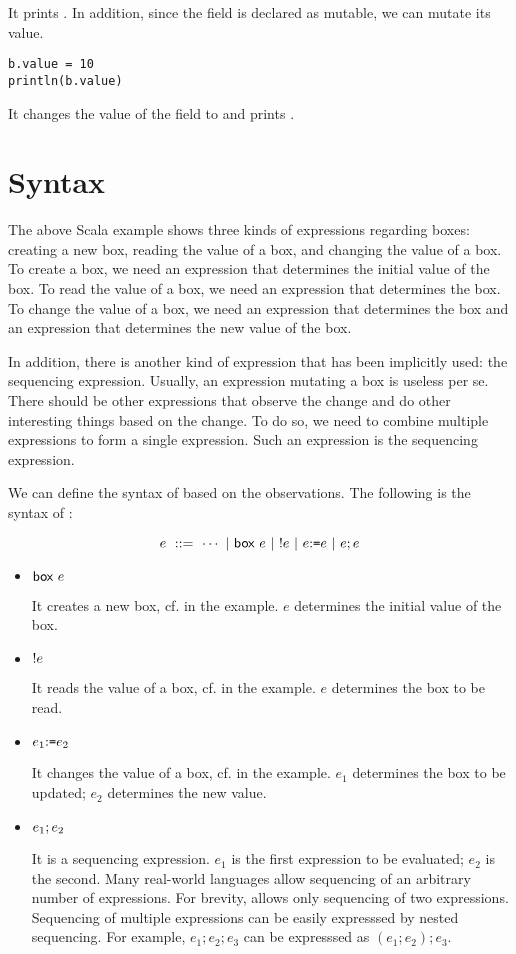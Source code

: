 It prints .
In addition, since the field  is declared as mutable, we can mutate
its value.

\begin{verbatim}
b.value = 10
println(b.value)
\end{verbatim}

It changes the value of the field to  and prints .

\section{Syntax}

The above Scala example shows three kinds of expressions regarding boxes:
creating a new box, reading the value of a box, and changing the value of a box.
To create a box, we need an expression that determines the initial value of the
box. To read the value of a box, we need an expression that determines the box.
To change the value of a box, we need an expression that determines the box and
an expression that determines the new value of the box.

In addition, there is another kind of expression that has been implicitly
used: the sequencing expression. Usually, an expression mutating a box is useless
per se. There should be other expressions that observe the change and do
other interesting things based on the change. To do so, we need to combine
multiple expressions to form a single expression. Such an expression
is the sequencing expression.

We can define the syntax of \lang based on the observations.
The following is the syntax of \lang:

\[
  e\ ::=\ \cdots\ |\ \eref{e}\ |\ \ederef{e}\ |\ \eset{e}{e}\ |\ \eseq{e}{e}
\]

\begin{itemize}
  \item $\textsf{box}\ e$

    It creates a new box, cf.  in the example.
    $e$ determines the initial value of the box.

  \item $!e$

    It reads the value of a box, cf.  in the example.
    $e$ determines the box to be read.

  \item $e_1{:}\texttt{=} e_2$

    It changes the value of a box, cf.  in the example.
    $e_1$ determines the box to be updated; $e_2$ determines the new value.

  \item $e_1;e_2$

    It is a sequencing expression. $e_1$ is the first expression to be
    evaluated; $e_2$ is the second. Many real-world languages allow sequencing
    of an arbitrary number of expressions. For brevity, \lang allows only
    sequencing of two expressions. Sequencing of multiple expressions can be
    easily expresssed by nested sequencing. For example, $e_1;e_2;e_3$ can be
    expresssed as $(e_1;e_2);e_3$.
\end{itemize}

